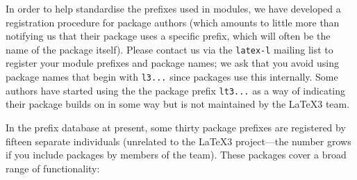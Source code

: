 \documentclass{ltnews}
\begin{document}
In order to help standardise the prefixes used in  modules, we have developed a registration procedure for package authors (which amounts to little more than notifying us that their package uses a specific prefix, which will often be the name of the package itself).
Please contact us via the \texttt{latex-l} mailing list to register your module prefixes and package names; we ask that you avoid using package names that begin with \texttt{l3...} since  packages use this internally.
Some authors have started using the the package prefix \texttt{lt3...} as a way of indicating their package builds on  in some way but is not maintained by the \LaTeX3 team.

In the prefix database at present, some thirty package prefixes are registered by fifteen separate individuals (unrelated to the \LaTeX3 project---the number grows if you include packages by members of the team).
These packages cover a broad range of functionality:
\end{document}
